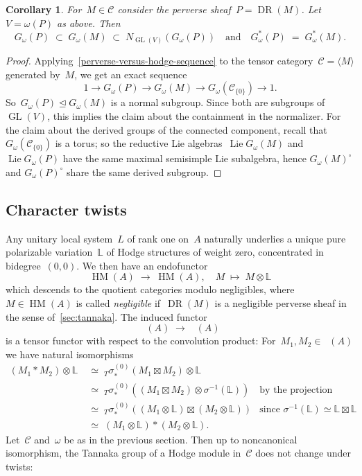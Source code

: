 \documentclass[a4paper]{amsart}
\newcommand{\bbL}{\mathbb{L}}
\newcommand{\cC}{\mathcal{C}}
\newcommand{\sssT}{\scriptscriptstyle{T}}
\newcommand{\tf}[1]{{_{\sssT}{#1}}}
\newcommand{\too}{\longrightarrow}
\DeclareMathOperator{\GL}{GL}
\DeclareMathOperator{\Lie}{Lie}
\DeclareMathOperator{\DR}{DR}
\DeclareMathOperator{\HM}{HM}
\DeclareMathOperator{\Mbar}{\overline{\HM}}
\theoremstyle{plain}
\newtheorem{corollary}[theorem]{Corollary}
\theoremstyle{definition}
\numberwithin{equation}{section}
\begin{document}
\begin{corollary} \label{cor:perverse-versus-hodge}
For~$M\in \cC$ consider the perverse sheaf~$P=\DR(M)$. Let~$V=\omega(P)$ as above. Then 
%
\[
 G_\omega(P) \;\subset\; G_\omega(M) \;\subset\; N_{\GL(V)}(G_\omega(P))
 \quad \text{and} \quad 
 G_\omega^*(P) \;=\; G_\omega^*(M). 
\] 
\end{corollary} 

\begin{proof}
Applying~\cref{perverse-versus-hodge-sequence} to the tensor category~$\cC = \langle M \rangle$ generated by~$M$, we get an exact sequence
%
\[
 1 \too G_\omega(P) \too G_\omega(M) \too G_\omega(\cC_{\{0\}}) \too 1.
\]
%
So~$G_\omega(P)\unlhd G_\omega(M)$ is a normal subgroup. Since both are subgroups of~$\GL(V)$, this implies the claim about the containment in the normalizer. For the claim about the derived groups of the connected component, recall that~$G_\omega(\cC_{\{0\}})$ is a torus; so the reductive Lie algebras~$\Lie G_\omega(M)$ and~$\Lie G_\omega(P)$ have the same maximal semisimple Lie subalgebra, hence $G_\omega(M)^\circ$ and $G_\omega(P)^\circ$ share the same derived subgroup.
\end{proof} 


\subsection{Character twists}

Any unitary local system~$L$ of rank one on~$A$ naturally underlies a unique pure polarizable variation~$\bbL$ of Hodge structures of weight zero, concentrated in bidegree~$(0,0)$. We then have an endofunctor
%
\[
 \HM(A) \;\longrightarrow\; \HM(A), \quad M \;\longmapsto\; M\otimes \bbL
\]
%
which descends to the quotient categories modulo negligibles, where~$M\in \HM(A)$ is called \emph{negligible} if~$\DR(M)$ is a negligible perverse sheaf in the sense of~\cref{sec:tannaka}. The induced functor
%
\[
 \Mbar(A) \;\longrightarrow\; \Mbar(A)
\]
%
is a tensor functor with respect to the convolution product: For~$M_1, M_2\in \Mbar(A)$ we have natural isomorphisms
%
\begin{align*} 
 (M_1*M_2)\otimes \bbL 
 &\;\simeq\; \tf{\sigma}_*^{(0)}(M_1 \boxtimes M_2) \otimes \bbL 
 & 
 \\[0.2em]
 &\;\simeq\; \tf{\sigma}_*^{(0)} ((M_1\boxtimes M_2) \otimes \sigma^{-1}(\bbL))
 & \text{by the projection formula}
 \\[0.2em]
 &\;\simeq\; \tf{\sigma}_*^{(0)} ((M_1\otimes \bbL) \boxtimes (M_2\otimes \bbL))
 & \text{since~$\sigma^{-1}(\bbL)\simeq \bbL \boxtimes \bbL$}
 \\[0.2em]
 &\;\simeq\; (M_1\otimes \bbL) * (M_2\otimes \bbL).
\end{align*}
%
Let~$\cC$ and~$\omega$ be as in the previous section. Then up to noncanonical isomorphism, the Tannaka group of a Hodge module in~$\cC$ does not change under twists:
\end{document}
